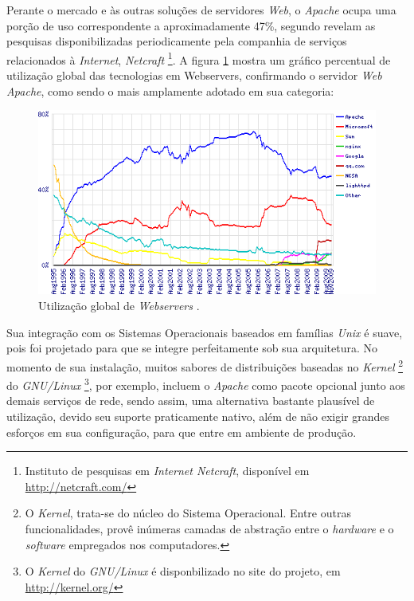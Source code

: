 Perante o mercado e às outras soluções de servidores \textit{Web}, o \textit{Apache} ocupa uma porção de uso correspondente a aproximadamente 47\%, segundo revelam as pesquisas \cite{Netcraft} disponibilizadas periodicamente pela companhia de serviços relacionados à \textit{Internet}, \textit{Netcraft} \footnote{Instituto de pesquisas em \textit{Internet Netcraft}, disponível em \url{http://netcraft.com/}}. A figura \ref{figura:utilizacao_webservers} mostra um gráfico percentual de utilização global das tecnologias em Webservers, confirmando o servidor \textit{Web Apache}, como sendo o mais amplamente adotado em sua categoria:

\begin{figure}[h]
    \begin{center}
        \includegraphics[scale=0.8]{./figuras/overallc.png}

        \caption{\label{figura:utilizacao_webservers}Utilização global de \textit{Webservers} \cite{Netcraft}.}
    \end{center}
\end{figure}

Sua integração com os Sistemas Operacionais baseados em famílias \textit{Unix} é suave, pois foi projetado para que se integre perfeitamente sob sua arquitetura. No momento de sua instalação, muitos sabores de distribuições baseadas no \textit{Kernel} \footnote{O \textit{Kernel}, trata-se do núcleo do Sistema Operacional. Entre outras funcionalidades, provê inúmeras camadas de abstração entre o \textit{hardware} e o \textit{software} empregados nos computadores.} do \textit{GNU/Linux} \footnote{O \textit{Kernel} do \textit{GNU/Linux} é disponbilizado no site do projeto, em \url{http://kernel.org/}}, por exemplo, incluem o \textit{Apache} como pacote opcional junto aos demais serviços de rede, sendo assim, uma alternativa bastante plausível de utilização, devido seu suporte praticamente nativo, além de não exigir grandes esforços em sua configuração, para que entre em ambiente de produção.

